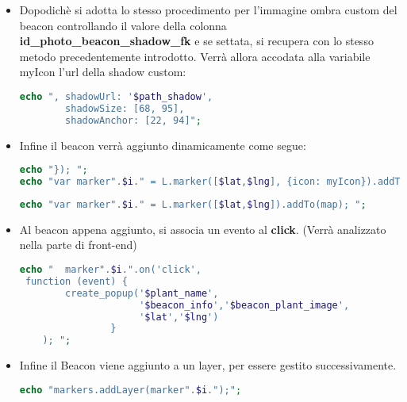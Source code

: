 \begin{itemize}
\item Dopodichè si adotta lo stesso procedimento per l'immagine ombra custom del beacon controllando il valore della colonna \newline \textbf{id\_photo\_beacon\_shadow\_fk} e se settata, si recupera con lo stesso metodo precedentemente introdotto. \newline
Verrà allora accodata alla variabile myIcon l'url della shadow custom:
\begin{lstlisting}[language=PHP]
echo ", shadowUrl: '$path_shadow', 
		shadowSize: [68, 95], 
		shadowAnchor: [22, 94]";
        \end{lstlisting}
\item Infine il beacon verrà aggiunto dinamicamente come segue:
\begin{lstlisting}[language=PHP , caption= Aggiunta dinamica di un beacon con la customizzazione del parametro icon.]
echo "}); ";       
echo "var marker".$i." = L.marker([$lat,$lng], {icon: myIcon}).addTo(map);".
\end{lstlisting}
\begin{lstlisting}[language=PHP , caption = Aggiunta dinamica di un beacon con immagini di default. (Blu)]
echo "var marker".$i." = L.marker([$lat,$lng]).addTo(map); ";
\end{lstlisting}
\item Al beacon appena aggiunto, si associa un evento al \textbf{click}. (Verrà analizzato nella parte di front-end)
\begin{lstlisting}[language=PHP]
 echo "  marker".$i.".on('click', 
 function (event) {
 		create_popup('$plant_name',
 					 '$beacon_info','$beacon_plant_image',
 					 '$lat','$lng')
 				}
 	); ";
\end{lstlisting}
\item Infine il Beacon viene aggiunto a un layer, per essere gestito successivamente.
\begin{lstlisting}[language=PHP]
echo "markers.addLayer(marker".$i.");";
\end{lstlisting}
\end{itemize}

